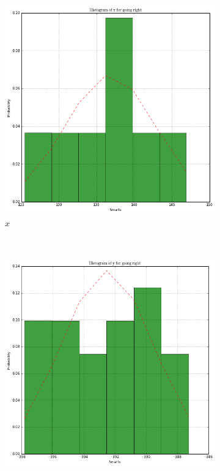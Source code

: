 \documentclass[paper=a4, fontsize=11pt]{scrartcl} %
\begin{document}
\begin{figure}[h!]
    \centering
    \begin{subfigure}[b]{0.3\textwidth}
        \setlength{\fboxsep}{0.5pt} %
        \setlength{\fboxrule}{0.5pt}
        \includegraphics[width=\textwidth,fbox]{images/histogram_5_x_right.png}
        \caption{$x$}
    \end{subfigure}
    ~
    \begin{subfigure}[b]{0.3\textwidth}
        \setlength{\fboxsep}{0.5pt} %
        \setlength{\fboxrule}{0.5pt}
        \includegraphics[width=\textwidth,fbox]{images/histogram_5_y_right.png}

\end{subfigure}
\end{figure}
\end{document}
